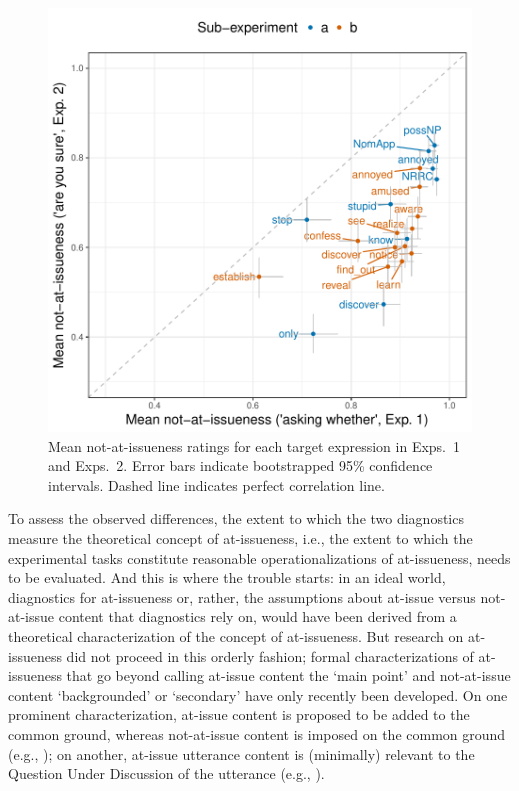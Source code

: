 \documentclass[11pt,fleqn]{article}
\newcommand{\6}{\mbox{$[\hspace*{-.6mm}[$}}
\newcommand{\9}{\mbox{$]\hspace*{-.6mm}]$}}
\begin{document}
\begin{figure}[!h]
\begin{center}

\includegraphics[width=12cm]{../results/ai-meta-analysis/graphs/correlation-bytrigger}

\end{center}
\caption{Mean not-at-issueness ratings for each target expression in Exps.~1 and Exps.~2. Error bars indicate bootstrapped 95\% confidence intervals. Dashed line indicates perfect correlation line.}
\label{fig:ai-correlation}
\end{figure}


To assess the observed differences, the extent to which the two diagnostics measure the theoretical concept of at-issueness, i.e., the extent to which the experimental tasks constitute reasonable operationalizations of at-issueness, needs to be evaluated. And this is where the trouble starts: in an ideal world, diagnostics for at-issueness or, rather, the assumptions about at-issue versus not-at-issue content that diagnostics rely on, would have been derived from a theoretical characterization of the concept of at-issueness. But research on at-issueness did not proceed in this orderly fashion;  formal characterizations of at-issueness that go beyond calling at-issue content the `main point' and not-at-issue content `backgrounded' or `secondary' have only recently been developed. On one prominent characterization, at-issue content is proposed to be added to the common ground, whereas not-at-issue content is imposed on the common ground (e.g., \citealt{murray2014,anderbois-etal2015}); on another, at-issue utterance content is (minimally) relevant to the Question Under Discussion of the utterance (e.g., \citealt{brst-salt10,brst-ar}). 
\end{document}
